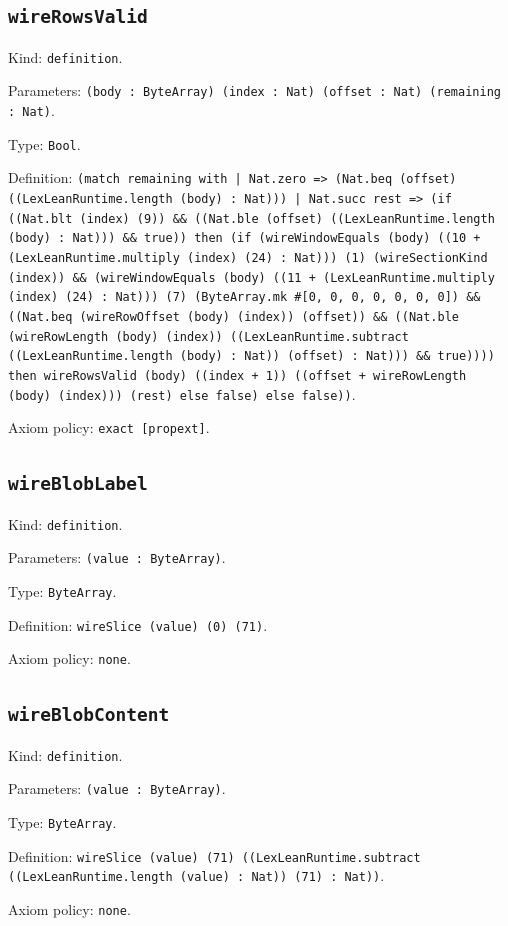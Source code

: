 \documentclass[11pt]{article}
\begin{document}
\subsection*{\texttt{wireRowsValid}}
\noindent Kind: \texttt{definition}.\par
\noindent Parameters: \texttt{(body : ByteArray) (index : Nat) (offset : Nat) (remaining : Nat)}.\par
\noindent Type: \texttt{Bool}.\par
\noindent Definition: \texttt{(match remaining with | Nat.zero => (Nat.beq (offset) ((LexLeanRuntime.length (body) : Nat))) | Nat.succ rest => (if ((Nat.blt (index) (9)) \&\& ((Nat.ble (offset) ((LexLeanRuntime.length (body) : Nat))) \&\& true)) then (if (wireWindowEquals (body) ((10 + (LexLeanRuntime.multiply (index) (24) : Nat))) (1) (wireSectionKind (index)) \&\& (wireWindowEquals (body) ((11 + (LexLeanRuntime.multiply (index) (24) : Nat))) (7) (ByteArray.mk \#[0, 0, 0, 0, 0, 0, 0]) \&\& ((Nat.beq (wireRowOffset (body) (index)) (offset)) \&\& ((Nat.ble (wireRowLength (body) (index)) ((LexLeanRuntime.subtract ((LexLeanRuntime.length (body) : Nat)) (offset) : Nat))) \&\& true)))) then wireRowsValid (body) ((index + 1)) ((offset + wireRowLength (body) (index))) (rest) else false) else false))}.\par
\noindent Axiom policy: \texttt{exact [propext]}.\par
\subsection*{\texttt{wireBlobLabel}}
\noindent Kind: \texttt{definition}.\par
\noindent Parameters: \texttt{(value : ByteArray)}.\par
\noindent Type: \texttt{ByteArray}.\par
\noindent Definition: \texttt{wireSlice (value) (0) (71)}.\par
\noindent Axiom policy: \texttt{none}.\par
\subsection*{\texttt{wireBlobContent}}
\noindent Kind: \texttt{definition}.\par
\noindent Parameters: \texttt{(value : ByteArray)}.\par
\noindent Type: \texttt{ByteArray}.\par
\noindent Definition: \texttt{wireSlice (value) (71) ((LexLeanRuntime.subtract ((LexLeanRuntime.length (value) : Nat)) (71) : Nat))}.\par
\noindent Axiom policy: \texttt{none}.\par
\end{document}
